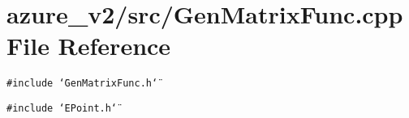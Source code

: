 \section{azure\_\-v2/src/Gen\-Matrix\-Func.cpp File Reference}
\label{GenMatrixFunc_8cpp}
{\tt \#include \char`\"{}Gen\-Matrix\-Func.h\char`\"{}}\par
{\tt \#include \char`\"{}EPoint.h\char`\"{}}\par
